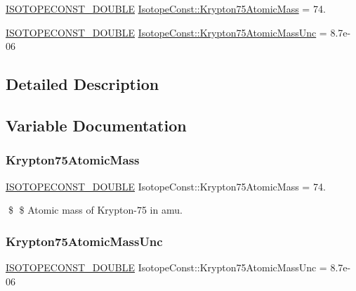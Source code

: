 \begin{DoxyCompactItemize}
\item 
\mbox{\hyperlink{group___isotope_const-_macros_ga8f45a7272ce02c0b4c65c44636ed719a}{I\+S\+O\+T\+O\+P\+E\+C\+O\+N\+S\+T\+\_\+\+D\+O\+U\+B\+LE}} \mbox{\hyperlink{group___isotope_const-_krypton-_kr75_ga6cebc95616f6aa3aea776b23b1afd0e6}{Isotope\+Const\+::\+Krypton75\+Atomic\+Mass}} = 74.
\item 
\mbox{\hyperlink{group___isotope_const-_macros_ga8f45a7272ce02c0b4c65c44636ed719a}{I\+S\+O\+T\+O\+P\+E\+C\+O\+N\+S\+T\+\_\+\+D\+O\+U\+B\+LE}} \mbox{\hyperlink{group___isotope_const-_krypton-_kr75_gafbb4591db75f6713bd2ea39563dc3e32}{Isotope\+Const\+::\+Krypton75\+Atomic\+Mass\+Unc}} = 8.\+7e-\/06
\end{DoxyCompactItemize}


\subsection{Detailed Description}


\subsection{Variable Documentation}
\mbox{\label{group___isotope_const-_krypton-_kr75_ga6cebc95616f6aa3aea776b23b1afd0e6}} 
\subsubsection{\texorpdfstring{Krypton75\+Atomic\+Mass}{Krypton75AtomicMass}}
{\footnotesize\ttfamily \mbox{\hyperlink{group___isotope_const-_macros_ga8f45a7272ce02c0b4c65c44636ed719a}{I\+S\+O\+T\+O\+P\+E\+C\+O\+N\+S\+T\+\_\+\+D\+O\+U\+B\+LE}} Isotope\+Const\+::\+Krypton75\+Atomic\+Mass = 74.}

\$ \$ Atomic mass of Krypton-\/75 in amu. \mbox{\label{group___isotope_const-_krypton-_kr75_gafbb4591db75f6713bd2ea39563dc3e32}} 
\subsubsection{\texorpdfstring{Krypton75\+Atomic\+Mass\+Unc}{Krypton75AtomicMassUnc}}
{\footnotesize\ttfamily \mbox{\hyperlink{group___isotope_const-_macros_ga8f45a7272ce02c0b4c65c44636ed719a}{I\+S\+O\+T\+O\+P\+E\+C\+O\+N\+S\+T\+\_\+\+D\+O\+U\+B\+LE}} Isotope\+Const\+::\+Krypton75\+Atomic\+Mass\+Unc = 8.\+7e-\/06}

